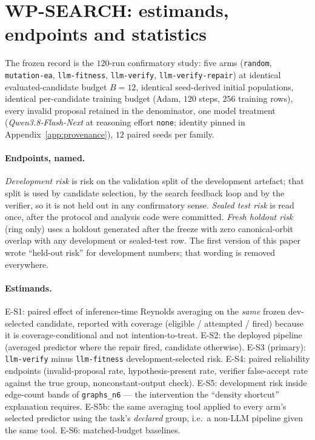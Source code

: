 \documentclass{neurips_2024}
\newcommand{\MODEL}{\textit{Qwen3.8-Flash-Next}}
\begin{document}
\section{WP-SEARCH: estimands, endpoints and statistics}
\label{sec:protocol}
\label{sec:search}

The frozen record is the $120$-run confirmatory study: five arms
(\texttt{random}, \texttt{mutation-ea}, \texttt{llm-fitness}, \texttt{llm-verify},
\texttt{llm-verify-repair}) at identical evaluated-candidate budget $B{=}12$, identical
seed-derived initial populations, identical per-candidate training budget (Adam, $120$
steps, $256$ training rows), every invalid proposal retained in the denominator, one model
treatment (\MODEL{} at reasoning effort \texttt{none}; identity pinned in
Appendix~\ref{app:provenance}), $12$ paired seeds per family.

\paragraph{Endpoints, named.} \emph{Development risk} is risk on the validation split of
the development artefact; that split is used by candidate selection, by the search
feedback loop and by the verifier, so it is not held out in any confirmatory sense.
\emph{Sealed test risk} is read once, after the protocol and analysis code were committed.
\emph{Fresh holdout risk} (ring only) uses a holdout generated after the freeze with zero
canonical-orbit overlap with any development or sealed-test row. The first version of this
paper wrote ``held-out risk'' for development numbers; that wording is removed everywhere.

\paragraph{Estimands.} E-S1: paired effect of inference-time Reynolds averaging on the
\emph{same} frozen dev-selected candidate, reported with coverage (eligible / attempted /
fired) because it is coverage-conditional and not intention-to-treat. E-S2: the deployed
pipeline (averaged predictor where the repair fired, candidate otherwise). E-S3 (primary):
\texttt{llm-verify} minus \texttt{llm-fitness} development-selected risk. E-S4: paired
reliability endpoints (invalid-proposal rate, hypothesis-present rate, verifier
false-accept rate against the true group, nonconstant-output check). E-S5: development
risk inside edge-count bands of \texttt{graphs\_n6} --- the intervention the
``density shortcut'' explanation requires. E-S5b: the same averaging tool applied to every
arm's selected predictor using the task's \emph{declared} group, i.e.\ a non-LLM pipeline
given the same tool. E-S6: matched-budget baselines.
\end{document}
